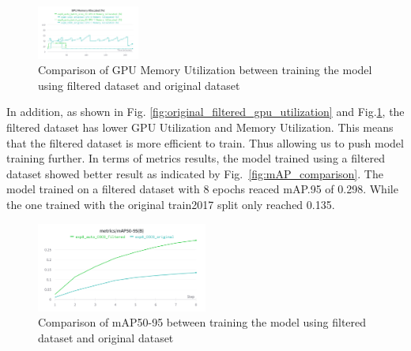 \documentclass[conference]{IEEEtran}
\begin{document}
\begin{figure}[h!]
\centering
\includegraphics[width=0.3\textwidth,keepaspectratio]{memory_utilization_comparison_original_and_filtered.png}
\caption{Comparison of GPU Memory Utilization between training the model using filtered dataset and original dataset}
\label{fig:original_filtered_memory_utilization}
\end{figure}
In addition, as shown in Fig. \ref{fig:original_filtered_gpu_utilization} and Fig.\ref{fig:original_filtered_memory_utilization}, the filtered dataset has lower GPU Utilization and Memory Utilization. This means that the filtered dataset is more efficient to train.
Thus allowing us to push model training further.
In terms of metrics results, the model trained using a filtered dataset showed better result as indicated by Fig.~\ref{fig:mAP_comparison}. The model trained on a filtered dataset with 8 epochs reaced mAP.95 of 0.298. While the one trained with the original train2017 split only reached 0.135.
\begin{figure}
    \centering
    \includegraphics[width=0.5\textwidth,keepaspectratio]{comparison_mAP_filtered.png}
    \caption{Comparison of mAP50-95 between training the model using filtered dataset and original dataset}
\end{figure}
\end{document}
